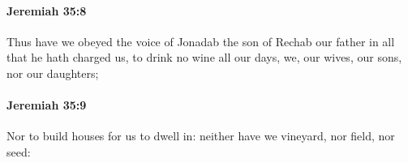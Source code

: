 		\paragraph{Jeremiah 35:8} %
			\label{JEREMIAH-35-8}

			Thus have we obeyed the voice of Jonadab the son of Rechab our father in all that he hath charged us, to drink no wine all our days, we, our wives, our sons, nor our daughters;


		\paragraph{Jeremiah 35:9} %
			\label{JEREMIAH-35-9}

			Nor to build houses for us to dwell in: neither have we vineyard, nor field, nor seed:


